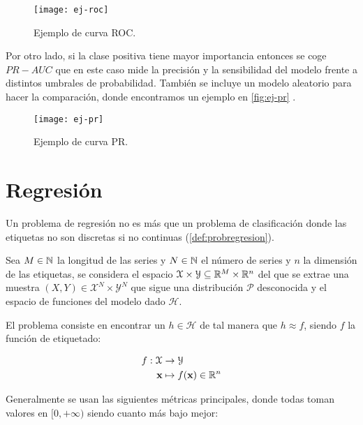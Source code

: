 \begin{figure}[htpb]
  \centering
  \texttt{[image: ej-roc]}
  \caption{Ejemplo de curva ROC.}
  \label{fig:ej-roc}
\end{figure}

Por otro lado, si la clase positiva tiene mayor importancia entonces se coge $PR-AUC$ que en este caso mide la precisión y la sensibilidad del modelo frente a distintos umbrales de probabilidad. También se incluye un modelo aleatorio para hacer la comparación, donde encontramos un ejemplo en \autoref{fig:ej-pr} \cite{scikit2020pr}.

\begin{figure}[htpb]
  \centering
  \texttt{[image: ej-pr]}
  \caption{Ejemplo de curva PR.}
  \label{fig:ej-pr}
\end{figure}

\section{Regresión}

Un problema de regresión no es más que un problema de clasificación donde las etiquetas no son discretas si no continuas (\autoref{def:probregresion}).

\begin{definicion}
  Sea $M \in \mathbb{N}$ la longitud de las series y $N \in \mathbb{N}$ el número de series y $n$ la dimensión de las etiquetas, se considera el espacio $\mathcal{X} \times \mathcal{Y} \subseteq \mathbb{R}^M \times \mathbb{R}^n$ del que se extrae una muestra $(X, Y) \in \mathcal{X}^N \times \mathcal{Y}^N$ que sigue una distribución $\mathcal{P}$ desconocida y el espacio de funciones del modelo dado $\mathcal{H}$.

  El problema consiste en encontrar un $h \in \mathcal{H}$ de tal manera que $h \approx f$, siendo $f$ la función de etiquetado:

  \begin{align*}
    f : \mathcal{X} & \to \mathcal{Y} \\
    \textbf{x} & \mapsto f(\textbf{x}) \in \mathbb{R}^n
  \end{align*}
  \label{def:probregresion}
\end{definicion}

Generalmente se usan las siguientes métricas principales, donde todas toman valores en $[0, +\infty)$ siendo cuanto más bajo mejor:

